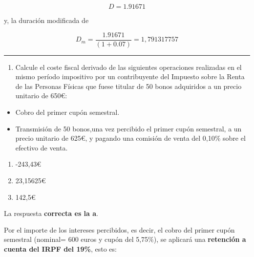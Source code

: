 \documentclass[
  letterpaper,
  DIV=11,
  numbers=noendperiod]{scrreprt}
\providecommand{\tightlist}{%
  \setlength{\itemsep}{0pt}\setlength{\parskip}{0pt}}\usepackage{longtable,booktabs,array}
\begin{document}
\begin{tcolorbox}
\begin{tcolorbox}
\[D=1.91671\]

y, la duración modificada de

\[D_m=\frac{1.91671}{\left(1+0.07\right)}=1,791317757\]

\end{tcolorbox}

\begin{center}\rule{0.5\linewidth}{0.5pt}\end{center}

\begin{enumerate}
\def\labelenumi{\arabic{enumi}.}
\setcounter{enumi}{2}
\tightlist
\item
  Calcule el coste fiscal derivado de las siguientes operaciones
  realizadas en el mismo período impositivo por un contribuyente del
  Impuesto sobre la Renta de las Personas Físicas que fuese titular de
  50 bonos adquiridos a un precio unitario de 650€:
\end{enumerate}

\begin{itemize}
\item
  Cobro del primer cupón semestral.
\item
  Transmisión de 50 bonos,una vez percibido el primer cupón semestral, a
  un precio unitario de 625€, y pagando una comisión de venta del 0,10\%
  sobre el efectivo de venta.
\end{itemize}

\begin{enumerate}
\def\labelenumi{\alph{enumi}.}
\item
  -243,43€
\item
  23,15625€
\item
  142,5€
\end{enumerate}

\begin{tcolorbox}[enhanced jigsaw, toprule=.15mm, left=2mm, breakable, opacitybacktitle=0.6, toptitle=1mm, coltitle=black, arc=.35mm, leftrule=.75mm, bottomtitle=1mm, titlerule=0mm, title=\textcolor{quarto-callout-tip-color}{\faLightbulb}\hspace{0.5em}{Solución}, rightrule=.15mm, opacityback=0, bottomrule=.15mm, colback=white, colframe=quarto-callout-tip-color-frame, colbacktitle=quarto-callout-tip-color!10!white]

La respuesta \textbf{correcta es la a}.

Por el importe de los intereses percibidos, es decir, el cobro del
primer cupón semestral (nominal= 600 euros y cupón del 5,75\%), se
aplicará una \textbf{retención a cuenta del IRPF del 19\%}, esto es:


\end{tcolorbox}
\end{tcolorbox}
\end{document}
